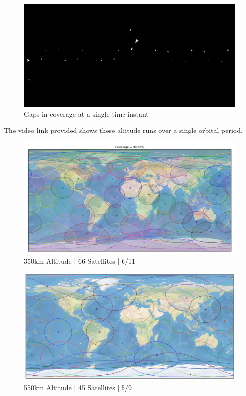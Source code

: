 \documentclass{article}
\begin{document}
\begin{figure}[H]
  \centering
    \includegraphics[width=0.5\linewidth]{figures/masking}
    \caption{Gaps in coverage at a single time instant}
  \label{fig:mask}
\end{figure}

The video link provided shows these altitude runs over a single orbital period.
\begin{figure}[H]
  \centering
  \includegraphics[width=\linewidth]{figures/350km_coverage}
  \caption{350km Altitude | 66 Satellites | 6/11}
\end{figure}
\begin{figure}[H]
  \centering
  \includegraphics[width=\linewidth]{figures/500km_coverage}
  \caption{550km Altitude | 45 Satellites | 5/9}
\end{figure}
\end{document}
